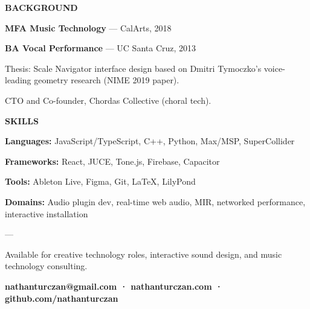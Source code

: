 \documentclass[10pt]{article}
\begin{document}
\noindent
\begin{minipage}[t]{0.48\textwidth}
{\normalsize\bfseries BACKGROUND}
\vspace{0.3em}

{\scriptsize
\textbf{MFA Music Technology} — CalArts, 2018

\textbf{BA Vocal Performance} — UC Santa Cruz, 2013

Thesis: Scale Navigator interface design based on Dmitri Tymoczko's voice-leading geometry research (NIME 2019 paper).

CTO and Co-founder, Chordas Collective (choral tech).
}
\end{minipage}%
\hfill%
\begin{minipage}[t]{0.48\textwidth}
{\normalsize\bfseries SKILLS}
\vspace{0.3em}

{\scriptsize
\textbf{Languages:} JavaScript/TypeScript, C++, Python, Max/MSP, SuperCollider

\textbf{Frameworks:} React, JUCE, Tone.js, Firebase, Capacitor

\textbf{Tools:} Ableton Live, Figma, Git, LaTeX, LilyPond

\textbf{Domains:} Audio plugin dev, real-time web audio, MIR, networked performance, interactive installation
}
\end{minipage}

\vspace{1em}

\begin{center}
{\normalsize\color{muted} — }

\vspace{0.3em}
{\small Available for creative technology roles, interactive sound design, and music technology consulting.}

\vspace{0.2em}
{\small\bfseries nathanturczan@gmail.com \quad · \quad nathanturczan.com \quad · \quad github.com/nathanturczan}
\end{center}
\end{document}
